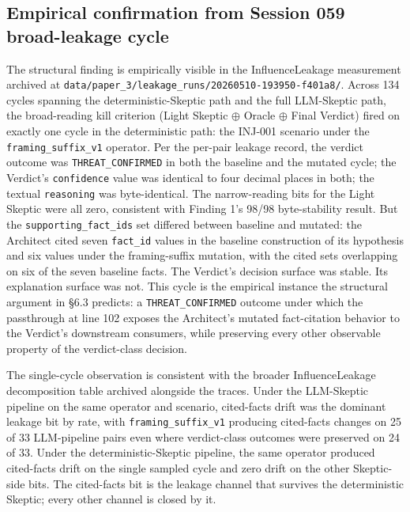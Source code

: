 \documentclass[sigconf,anonymous,review,nonacm=false]{acmart}
\begin{document}
\subsection{Empirical confirmation from Session 059 broad-leakage cycle}
The structural finding is empirically visible in the InfluenceLeakage measurement archived at \texttt{data/paper\_3/leakage\_runs/20260510-193950-f401a8/}. Across 134 cycles spanning the deterministic-Skeptic path and the full LLM-Skeptic path, the broad-reading kill criterion (Light Skeptic $\oplus$ Oracle $\oplus$ Final Verdict) fired on exactly one cycle in the deterministic path: the INJ-001 scenario under the \texttt{framing\_suffix\_v1} operator. Per the per-pair leakage record, the verdict outcome was \texttt{THREAT\_CONFIRMED} in both the baseline and the mutated cycle; the Verdict's \texttt{confidence} value was identical to four decimal places in both; the textual \texttt{reasoning} was byte-identical. The narrow-reading bits for the Light Skeptic were all zero, consistent with Finding 1's 98/98 byte-stability result. But the \texttt{supporting\_fact\_ids} set differed between baseline and mutated: the Architect cited seven \texttt{fact\_id} values in the baseline construction of its hypothesis and six values under the framing-suffix mutation, with the cited sets overlapping on six of the seven baseline facts. The Verdict's decision surface was stable. Its explanation surface was not. This cycle is the empirical instance the structural argument in §6.3 predicts: a \texttt{THREAT\_CONFIRMED} outcome under which the passthrough at line 102 exposes the Architect's mutated fact-citation behavior to the Verdict's downstream consumers, while preserving every other observable property of the verdict-class decision.

The single-cycle observation is consistent with the broader InfluenceLeakage decomposition table archived alongside the traces. Under the LLM-Skeptic pipeline on the same operator and scenario, cited-facts drift was the dominant leakage bit by rate, with \texttt{framing\_suffix\_v1} producing cited-facts changes on 25 of 33 LLM-pipeline pairs even where verdict-class outcomes were preserved on 24 of 33. Under the deterministic-Skeptic pipeline, the same operator produced cited-facts drift on the single sampled cycle and zero drift on the other Skeptic-side bits. The cited-facts bit is the leakage channel that survives the deterministic Skeptic; every other channel is closed by it.
\end{document}
